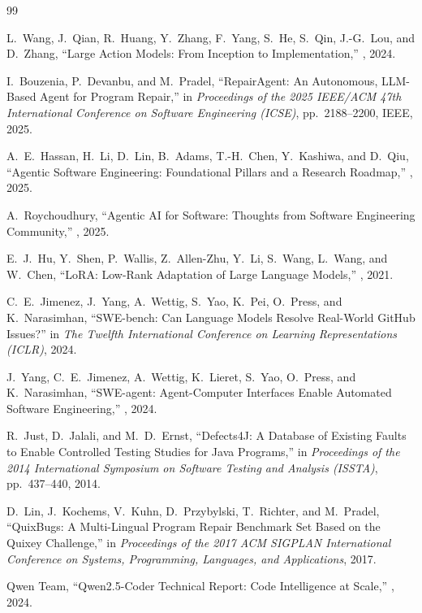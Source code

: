 \documentclass[12pt,a4paper]{report}
\begin{document}
\newpage
\begin{thebibliography}{99}

L.~Wang, J.~Qian, R.~Huang, Y.~Zhang, F.~Yang, S.~He, S.~Qin, J.-G.~Lou, and D.~Zhang,
\newblock ``Large Action Models: From Inception to Implementation,''
, 2024.

I.~Bouzenia, P.~Devanbu, and M.~Pradel,
\newblock ``RepairAgent: An Autonomous, LLM-Based Agent for Program Repair,''
\newblock in {\em Proceedings of the 2025 IEEE/ACM 47th International Conference on Software Engineering (ICSE)}, pp.~2188--2200, IEEE, 2025.

A.~E.~Hassan, H.~Li, D.~Lin, B.~Adams, T.-H.~Chen, Y.~Kashiwa, and D.~Qiu,
\newblock ``Agentic Software Engineering: Foundational Pillars and a Research Roadmap,''
, 2025.

A.~Roychoudhury,
\newblock ``Agentic AI for Software: Thoughts from Software Engineering Community,''
, 2025.

E.~J.~Hu, Y.~Shen, P.~Wallis, Z.~Allen-Zhu, Y.~Li, S.~Wang, L.~Wang, and W.~Chen,
\newblock ``LoRA: Low-Rank Adaptation of Large Language Models,''
, 2021.

C.~E.~Jimenez, J.~Yang, A.~Wettig, S.~Yao, K.~Pei, O.~Press, and K.~Narasimhan,
\newblock ``SWE-bench: Can Language Models Resolve Real-World GitHub Issues?''
\newblock in {\em The Twelfth International Conference on Learning Representations (ICLR)}, 2024.

J.~Yang, C.~E.~Jimenez, A.~Wettig, K.~Lieret, S.~Yao, O.~Press, and K.~Narasimhan,
\newblock ``SWE-agent: Agent-Computer Interfaces Enable Automated Software Engineering,''
, 2024.

R.~Just, D.~Jalali, and M.~D.~Ernst,
\newblock ``Defects4J: A Database of Existing Faults to Enable Controlled Testing Studies for Java Programs,''
\newblock in {\em Proceedings of the 2014 International Symposium on Software Testing and Analysis (ISSTA)}, pp.~437--440, 2014.

D.~Lin, J.~Kochems, V.~Kuhn, D.~Przybylski, T.~Richter, and M.~Pradel,
\newblock ``QuixBugs: A Multi-Lingual Program Repair Benchmark Set Based on the Quixey Challenge,''
\newblock in {\em Proceedings of the 2017 ACM SIGPLAN International Conference on Systems, Programming, Languages, and Applications}, 2017.

Qwen Team,
\newblock ``Qwen2.5-Coder Technical Report: Code Intelligence at Scale,''
, 2024.

\end{thebibliography}
\end{document}
